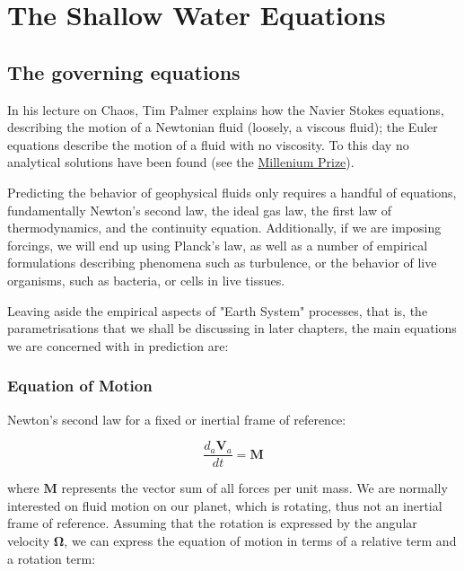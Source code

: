 \newpage
{} %
\chapter{The Shallow Water Equations}\label{chapter-SWEs}

\vspace{1em}


\section{The governing equations}

In his lecture on Chaos, Tim Palmer explains how the Navier Stokes equations, describing the motion of a Newtonian fluid (loosely, a viscous fluid); the Euler equations describe the motion of a fluid with no viscosity. To this day no analytical solutions have been found (see the \href{https://en.wikipedia.org/wiki/Millennium_Prize_Problems}{Millenium Prize}). 

Predicting the behavior of geophysical fluids only requires a handful of equations, fundamentally Newton's second law, the ideal gas law, the first law of thermodynamics, and the continuity equation. Additionally, if we are imposing forcings, we will end up using Planck's law, as well as a number of empirical formulations describing phenomena such as turbulence, or the behavior of live organisms, such as bacteria, or cells in live tissues.

Leaving aside the empirical aspects of "Earth System" processes, that is, the parametrisations that we shall be discussing in later chapters, the main equations we are concerned with in prediction are:

\subsection{Equation of Motion}

Newton's second law for a fixed or inertial frame of reference:

\begin{equation}
	\frac{d_a \bm{V}_a}{dt}=\bm{M}
\end{equation}

where $\bm{M}$ represents the vector sum of all forces per unit mass. We are normally interested on fluid motion on our planet, which is rotating, thus not an inertial frame of reference. Assuming that the rotation is expressed by the angular velocity $\bm{\Omega}$, we can express the equation of motion in terms of a relative term and a rotation term:


